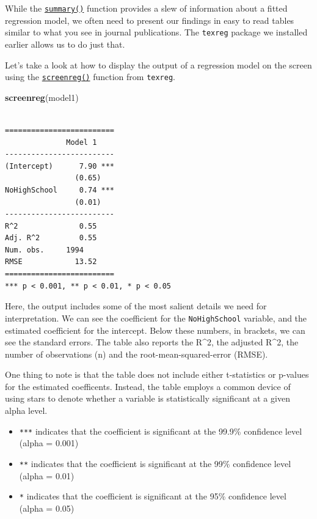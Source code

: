 \documentclass[]{article}
\newenvironment{Shaded}{\begin{snugshade}}{\end{snugshade}}
\newcommand{\KeywordTok}[1]{\textcolor[rgb]{0.13,0.29,0.53}{\textbf{#1}}}
\newcommand{\NormalTok}[1]{#1}
\providecommand{\tightlist}{%
  \setlength{\itemsep}{0pt}\setlength{\parskip}{0pt}}
\theoremstyle{definition}
\theoremstyle{definition}
\theoremstyle{definition}
\theoremstyle{remark}
\begin{document}
While the \href{http://bit.ly/R_summary}{\texttt{summary()}} function
provides a slew of information about a fitted regression model, we often
need to present our findings in easy to read tables similar to what you
see in journal publications. The \texttt{texreg} package we installed
earlier allows us to do just that.

Let's take a look at how to display the output of a regression model on
the screen using the \href{http://bit.ly/R_texreg}{\texttt{screenreg()}}
function from \texttt{texreg}.

\begin{Shaded}
\begin{Highlighting}[]
\KeywordTok{screenreg}\NormalTok{(model1)}
\end{Highlighting}
\end{Shaded}

\begin{verbatim}

=========================
              Model 1    
-------------------------
(Intercept)      7.90 ***
                (0.65)   
NoHighSchool     0.74 ***
                (0.01)   
-------------------------
R^2              0.55    
Adj. R^2         0.55    
Num. obs.     1994       
RMSE            13.52    
=========================
*** p < 0.001, ** p < 0.01, * p < 0.05
\end{verbatim}

Here, the output includes some of the most salient details we need for
interpretation. We can see the coefficient for the \texttt{NoHighSchool}
variable, and the estimated coefficient for the intercept. Below these
numbers, in brackets, we can see the standard errors. The table also
reports the R\^{}2, the adjusted R\^{}2, the number of observations (n)
and the root-mean-squared-error (RMSE).

One thing to note is that the table does not include either t-statistics
or p-values for the estimated coefficents. Instead, the table employs a
common device of using stars to denote whether a variable is
statistically significant at a given alpha level.

\begin{itemize}
\tightlist
\item
  \texttt{***} indicates that the coefficient is significant at the
  99.9\% confidence level (alpha = 0.001)
\item
  \texttt{**} indicates that the coefficient is significant at the 99\%
  confidence level (alpha = 0.01)
\item
  \texttt{*} indicates that the coefficient is significant at the 95\%
  confidence level (alpha = 0.05)
\end{itemize}
\end{document}
